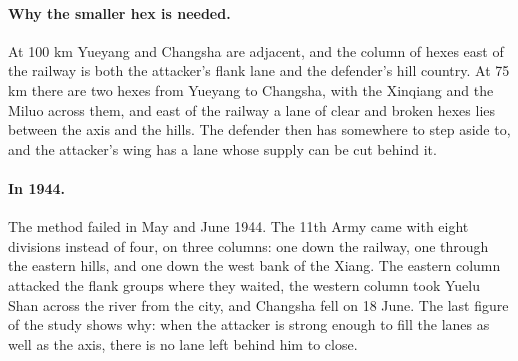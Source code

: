 \paragraph{Why the smaller hex is needed.} At 100 km Yueyang and Changsha are adjacent, and the column of hexes east of the railway is both the attacker's flank lane and the defender's hill country. At 75 km there are two hexes from Yueyang to Changsha, with the Xinqiang and the Miluo across them, and east of the railway a lane of clear and broken hexes lies between the axis and the hills. The defender then has somewhere to step aside to, and the attacker's wing has a lane whose supply can be cut behind it.
\paragraph{In 1944.} The method failed in May and June 1944. The 11th Army came with eight divisions instead of four, on three columns: one down the railway, one through the eastern hills, and one down the west bank of the Xiang. The eastern column attacked the flank groups where they waited, the western column took Yuelu Shan across the river from the city, and Changsha fell on 18 June. The last figure of the study shows why: when the attacker is strong enough to fill the lanes as well as the axis, there is no lane left behind him to close.

